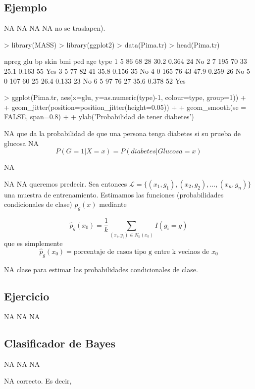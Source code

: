\documentclass[nohyper]{tufte-handout}
\begin{document}
\subsection{Ejemplo}
NA
NA
NA
NA
no se traslapen). 
\begin{Schunk}
\begin{Sinput}
> library(MASS)
> library(ggplot2)
> data(Pima.tr)
> head(Pima.tr)
\end{Sinput}
\begin{Soutput}
  npreg glu bp skin  bmi   ped age type
1     5  86 68   28 30.2 0.364  24   No
2     7 195 70   33 25.1 0.163  55  Yes
3     5  77 82   41 35.8 0.156  35   No
4     0 165 76   43 47.9 0.259  26   No
5     0 107 60   25 26.4 0.133  23   No
6     5  97 76   27 35.6 0.378  52  Yes
\end{Soutput}
\begin{Sinput}
> ggplot(Pima.tr, aes(x=glu, y=as.numeric(type)-1, colour=type, group=1)) + 
+   geom_jitter(position=position_jitter(height=0.05)) + 
+   geom_smooth(se = FALSE, span=0.8) + 
+   ylab('Probabilidad de tener diabetes')
\end{Sinput}
\end{Schunk}
NA
que da la probabilidad de que una persona tenga diabetes si su prueba de glucosa
NA
$$P(G=1 | X=x)=P(diabetes| Glucosa = x)$$


NA

NA
NA
queremos predecir. Sea entonces ${\mathcal L}=\{(x_1,g_1), (x_2,g_2),\ldots,(x_n,g_n)\}$ una muestra de entrenamiento.
Estimamos las funciones (probabilidades condicionales de clase) $p_g(x)$
mediante

$$\hat{p}_g(x_0)=\frac{1}{k}\sum_{(x_i,y_i)\in N_k(x_0)} I(g_i=g)$$
que es simplemente
$$\hat{p}_g (x_0)=\mbox{porcentaje de casos tipo g entre k vecinos de }x_0$$

NA
clase para estimar las probabilidades condicionales de clase.


\subsection{Ejercicio}
NA
NA
NA



\subsection{Clasificador de Bayes}

NA
NA
NA

NA
correcto. Es decir,
\end{document}
